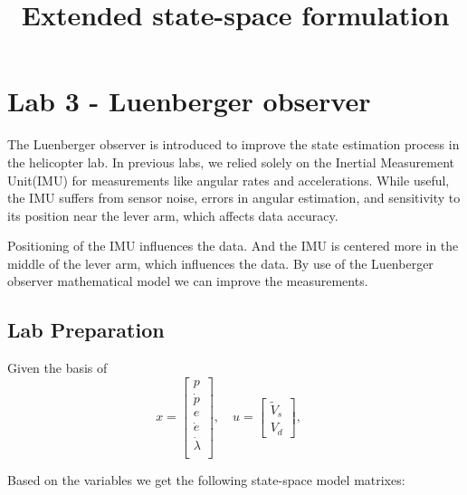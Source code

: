 \section{Lab 3 - Luenberger observer}

The Luenberger observer is introduced to improve the state estimation process in the helicopter lab. In previous labs, we relied solely on the Inertial Measurement Unit(IMU) for measurements like angular rates and accelerations. While useful, the IMU suffers from sensor noise, errors in angular estimation, and sensitivity to its position near the lever arm, which affects data accuracy.
\vspace{1em}

Positioning of the IMU influences the data. And the IMU is centered more in the middle of the lever arm, which influences the data.
By use of the Luenberger observer mathematical model we can improve the measurements.
\vspace{1em}

\subsection{Lab Preparation}
\title{\textbf{Extended state-space formulation}}
\maketitle
\vspace{1em}


Given the basis of
\[
x =
\begin{bmatrix}
{p} \\
\dot{p}\\
{e} \\
\dot{e} \\

\dot{{\lambda}} \\


\end{bmatrix}, \quad
u =
\begin{bmatrix}
\tilde{V}_s \\
V_d
\end{bmatrix}, \quad
\]

Based on the variables we get the following state-space model matrixes:

